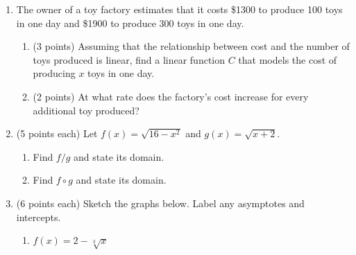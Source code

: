 \documentclass[12pt]{article}
\begin{document}
\begin{enumerate}

\item The owner of a toy factory estimates that it costs \$1300 to produce 100 toys in one day and \$1900 to produce 300 toys in one day.
\begin{enumerate}
\item (3 points) Assuming that the relationship between cost and the number of toys produced is linear, find a linear function $C$ that models the cost of producing $x$ toys in one day.\\
\vspace{.7in}
\item (2 points) At what rate does the factory's cost increase for every additional toy produced?
\vspace{.3in}
\end{enumerate}
\item (5 points each) Let $f(x)=\sqrt{16-x^2}$ and $g(x)=\sqrt{x+2}.$
\begin{enumerate}
\item Find $f/g$ and state its domain.
\vfill
\item Find $f\circ g$ and state its domain.
\vfill
\end{enumerate}
\newpage
\item (6 points each) Sketch the graphs below. Label any asymptotes and intercepts.
\begin{enumerate}
\item 
\begin{minipage}[l]{7cm}
$f(x)=2-\sqrt[3]{x}$
\end{minipage}%
\begin{minipage}[c]{10cm}
\end{minipage}

\end{enumerate}
\end{enumerate}
\end{document}
